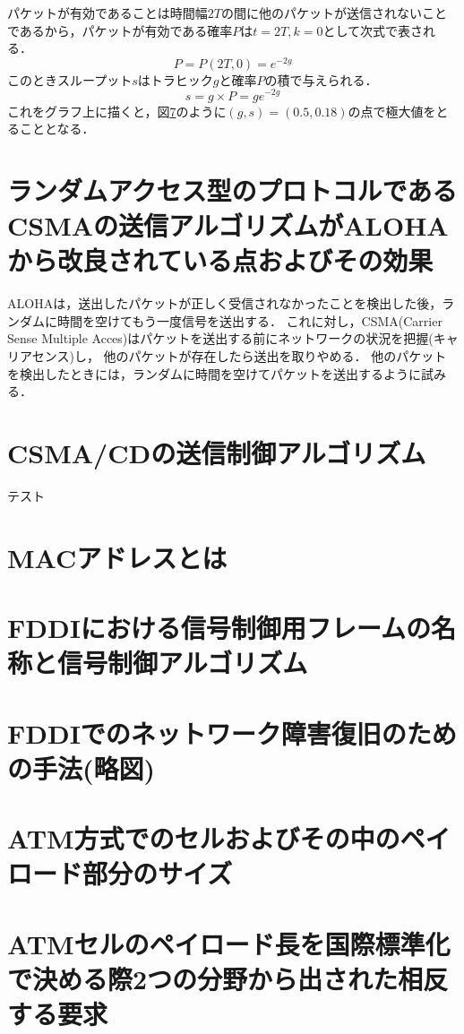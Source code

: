 \documentclass[10.5pt]{jsarticle}
\begin{document}
パケットが有効であることは時間幅$2T$の間に他のパケットが送信されないことであるから，パケットが有効である確率$P$は$t=2T, k=0$として次式で表される．
\[P = P(2T, 0) = e^{-2g}\]
このときスループット$s$はトラヒック$g$と確率$P$の積で与えられる．
\[s = g \times P = ge^{-2g}\]
これをグラフ上に描くと，図\ref{}のように$(g, s) = (0.5, 0.18)$の点で極大値をとることとなる．

\section{ランダムアクセス型のプロトコルであるCSMAの送信アルゴリズムがALOHAから改良されている点およびその効果}
ALOHAは，送出したパケットが正しく受信されなかったことを検出した後，ランダムに時間を空けてもう一度信号を送出する．
これに対し，CSMA(Carrier Sense Multiple Acces)はパケットを送出する前にネットワークの状況を把握(キャリアセンス)し，
他のパケットが存在したら送出を取りやめる．
他のパケットを検出したときには，ランダムに時間を空けてパケットを送出するように試みる．

\section{CSMA/CDの送信制御アルゴリズム}
テスト


\section{MACアドレスとは}



\section{FDDIにおける信号制御用フレームの名称と信号制御アルゴリズム}



\section{FDDIでのネットワーク障害復旧のための手法(略図)}



\section{ATM方式でのセルおよびその中のペイロード部分のサイズ}



\section{ATMセルのペイロード長を国際標準化で決める際2つの分野から出された相反する要求}
\end{document}

